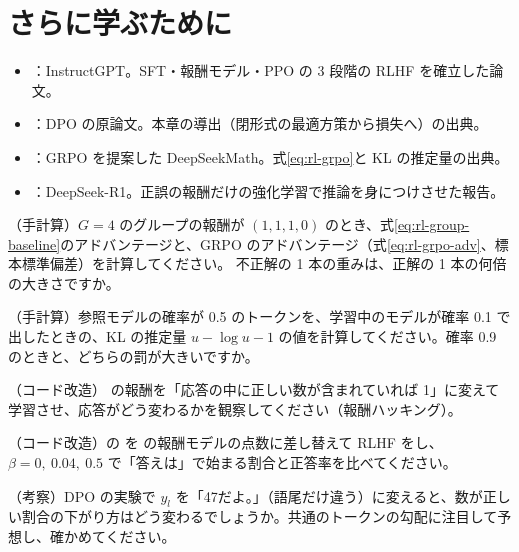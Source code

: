 \section*{さらに学ぶために}
\begin{itemize}
\item \cite{ouyang2022training}：InstructGPT。SFT・報酬モデル・PPO の 3 段階の RLHF を確立した論文。
\item \cite{rafailov2023direct}：DPO の原論文。本章の導出（閉形式の最適方策から損失へ）の出典。
\item \cite{shao2024deepseekmath}：GRPO を提案した DeepSeekMath。式\eqref{eq:rl-grpo}と KL の推定量の出典。
\item \cite{guo2025deepseekr1}：DeepSeek-R1。正誤の報酬だけの強化学習で推論を身につけさせた報告。
\end{itemize}

\begin{exercises}
\item （手計算）$G=4$ のグループの報酬が $(1,1,1,0)$ のとき、式\eqref{eq:rl-group-baseline}のアドバンテージと、GRPO のアドバンテージ（式\eqref{eq:rl-grpo-adv}、標本標準偏差）を計算してください。
不正解の 1 本の重みは、正解の 1 本の何倍の大きさですか。
\item （手計算）参照モデルの確率が 0.5 のトークンを、学習中のモデルが確率 0.1 で出したときの、KL の推定量 $u-\log u-1$ の値を計算してください。確率 0.9 のときと、どちらの罰が大きいですか。
\item （コード改造） の報酬を「応答の中に正しい数が含まれていれば 1」に変えて学習させ、応答がどう変わるかを観察してください（報酬ハッキング）。
\item （コード改造）の  を  の報酬モデルの点数に差し替えて RLHF をし、$\beta=0,\ 0.04,\ 0.5$ で「答えは」で始まる割合と正答率を比べてください。
\item （考察）DPO の実験で $y_l$ を「47だよ。」（語尾だけ違う）に変えると、数が正しい割合の下がり方はどう変わるでしょうか。共通のトークンの勾配に注目して予想し、確かめてください。
\end{exercises}
